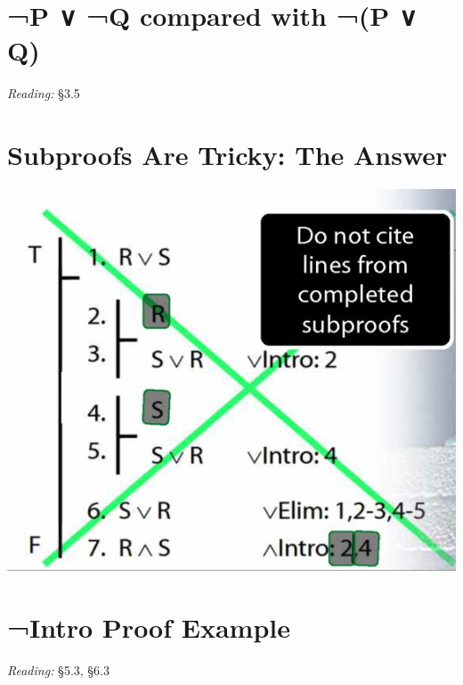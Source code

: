 \documentclass[12pt]{extarticle}
\begin{document}
\begin{multicols*}{3}
 
\section{¬P ∨ ¬Q compared with ¬(P ∨ Q)}
 
\emph{Reading:} §3.5
 
 
 
\section{Subproofs Are Tricky: The Answer}
 
\begin{center}
\includegraphics[scale=0.3]{img/unit_227_tricky_answer.png}
\end{center}
 
 
\section{¬Intro Proof Example}
 
\emph{Reading:} §5.3, §6.3
 

\end{multicols*}
\end{document}
